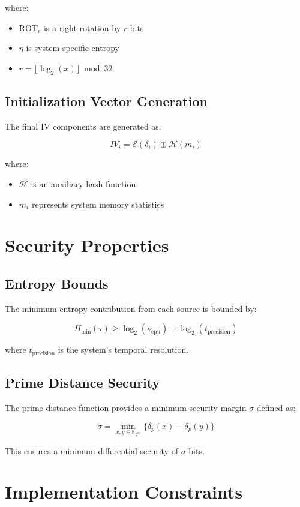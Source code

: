 \documentclass{article}
\begin{document}
where:
\begin{itemize}
  \item $\text{ROT}_r$ is a right rotation by $r$ bits
  \item $\eta$ is system-specific entropy
  \item $r = \lfloor\log_2(x)\rfloor \bmod 32$
\end{itemize}

\subsection{Initialization Vector Generation}

The final IV components are generated as:

\[
IV_i = \mathcal{E}(\delta_i) \oplus \mathcal{H}(m_i)
\]

where:
\begin{itemize}
  \item $\mathcal{H}$ is an auxiliary hash function
  \item $m_i$ represents system memory statistics
\end{itemize}

\section{Security Properties}

\subsection{Entropy Bounds}

The minimum entropy contribution from each source is bounded by:

\[
H_{\min}(\tau) \geq \log_2(\nu_{\text{cpu}}) + \log_2(t_{\text{precision}})
\]

where $t_{\text{precision}}$ is the system's temporal resolution.

\subsection{Prime Distance Security}

The prime distance function provides a minimum security margin $\sigma$ defined as:

\[
\sigma = \min_{x,y \in \mathbb{F}_{2^{32}}} \{\delta_p(x) - \delta_p(y)\}
\]

This ensures a minimum differential security of $\sigma$ bits.

\section{Implementation Constraints}
\end{document}
